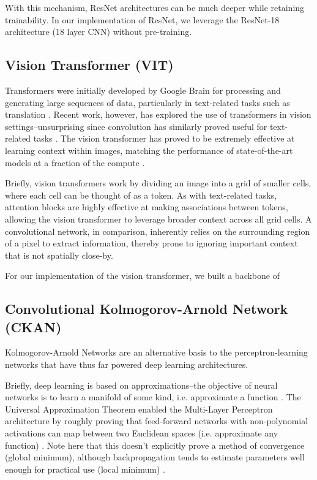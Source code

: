 \documentclass[conference]{IEEEtran}
\begin{document}
With this mechanism, ResNet architectures can be much deeper while retaining trainability. In our implementation of ResNet, we leverage the ResNet-18 architecture (18 layer CNN) without pre-training.

\subsection{Vision Transformer (VIT)}
Transformers were initially developed by Google Brain for processing and generating large sequences of data, particularly in text-related tasks such as translation \cite{transformer}. Recent work, however, has explored the use of transformers in vision settings--unsurprising since convolution has similarly proved useful for text-related tasks \cite{VIT} \cite{transformer}. The vision transformer has proved to be extremely effective at learning context within images, matching the performance of state-of-the-art models at a fraction of the compute \cite{VIT}.

Briefly, vision transformers work by dividing an image into a grid of smaller cells, where each cell can be thought of as a token. As with text-related tasks, attention blocks are highly effective at making associations between tokens, allowing the vision transformer to leverage broader context across all grid cells. A convolutional network, in comparison, inherently relies on the surrounding region of a pixel to extract information, thereby prone to ignoring important context that is not spatially close-by.

For our implementation of the vision transformer, we built a backbone of 


\subsection{Convolutional Kolmogorov-Arnold Network (CKAN)}
Kolmogorov-Arnold Networks are an alternative basis to the perceptron-learning networks that have thus far powered deep learning architectures.

Briefly, deep learning is based on approximations--the objective of neural networks is to learn a manifold of some kind, i.e. approximate a function \cite{mlp_approx_thm}. The Universal Approximation Theorem enabled the Multi-Layer Perceptron architecture by roughly proving that feed-forward networks with non-polynomial activations can map between two Euclidean spaces (i.e. approximate any function) \cite{mlp_approx_thm}. Note here that this doesn't explicitly prove a method of convergence (global minimum), although backpropagation tends to estimate parameters well enough for practical use (local minimum) \cite{mlp_approx_thm}.
\end{document}
